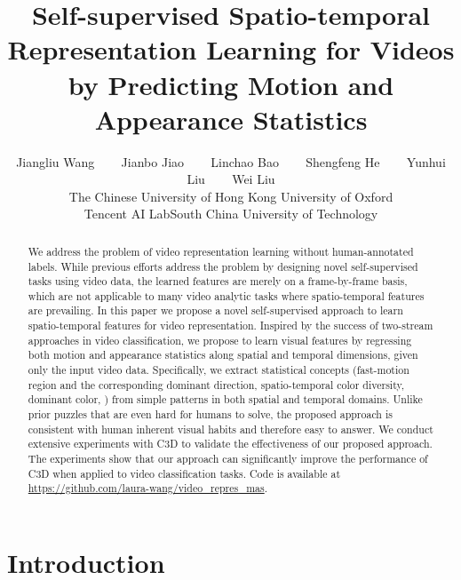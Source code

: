 \documentclass[10pt,twocolumn,letterpaper]{article}
\begin{document}
\title{Self-supervised Spatio-temporal Representation Learning for Videos \\by Predicting Motion and Appearance Statistics}

\author{Jiangliu Wang ~~~ Jianbo Jiao ~~~  Linchao Bao ~~~ Shengfeng He ~~~ Yunhui Liu ~~~ Wei Liu \\
The Chinese University of Hong Kong \quad University of Oxford \\
Tencent AI Lab\quad South China University of Technology }


\maketitle
\thispagestyle{empty}

\begin{abstract}
We address the problem of video representation learning without human-annotated labels. 
While previous efforts address the problem by designing novel self-supervised tasks using video data, the learned features are merely on a frame-by-frame basis, which are not applicable to many video analytic tasks where spatio-temporal features are prevailing. 
In this paper we propose a novel self-supervised approach to learn spatio-temporal features for video representation. 
Inspired by the success of two-stream approaches in video classification, we propose to learn visual features by regressing both motion and appearance statistics along spatial and temporal dimensions, given only the input video data. 
Specifically, we extract statistical concepts (fast-motion region and the corresponding dominant direction, spatio-temporal color diversity, dominant color, \etc) from simple patterns in both spatial and temporal domains. Unlike prior puzzles that are even hard for humans to solve, the proposed approach is consistent with human inherent visual habits and therefore easy to answer.
We conduct extensive experiments with C3D to validate the effectiveness of our proposed approach. 
The experiments show that our approach can significantly improve the performance of C3D when applied to video classification tasks. 
Code is available at \href{https://github.com/laura-wang/video_repres_mas}{https://github.com/laura-wang/video\_repres\_mas}.
\end{abstract}

\section{Introduction}
\end{document}
